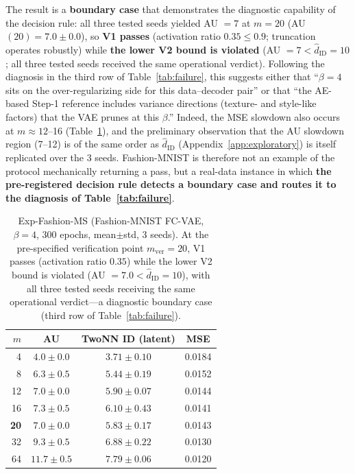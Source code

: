 \documentclass[make,article,submit,pdftex,moreauthors]{Definitions/mdpi}
\newcommand{\hatdID}{\hat{d}_{\mathrm{ID}}}
\begin{document}
The result is a \textbf{boundary case} that demonstrates the diagnostic
capability of the decision rule:
all three tested seeds yielded AU $= 7$ at $m = 20$
(AU$(20) = 7.0 \pm 0.0$), so
\textbf{V1 passes} (activation ratio $0.35 \leq 0.9$; truncation operates
robustly) while \textbf{the lower V2 bound is violated}
(AU $= 7 < \hatdID = 10$; all three tested seeds received the same
operational verdict).
Following the diagnosis in the third row of Table~\ref{tab:failure}, this
suggests either that ``$\beta = 4$ sits on the over-regularizing side for
this data--decoder pair'' or that ``the AE-based Step-1 reference includes
variance directions (texture- and style-like factors) that the VAE prunes
at this $\beta$.''
Indeed, the MSE slowdown also occurs at $m \approx 12$--16
(Table~\ref{tab:fashion_s3}), and the preliminary observation that the AU
slowdown region (7--12) is of the same order as $\hatdID$
(Appendix~\ref{app:exploratory}) is itself replicated over the 3 seeds.
Fashion-MNIST is therefore not an example of the protocol mechanically
returning a pass, but a real-data instance in which \textbf{the
pre-registered decision rule detects a boundary case and routes it to the
diagnosis of Table~\ref{tab:failure}}.

\begin{table}[H]
\caption{Exp-Fashion-MS (Fashion-MNIST FC-VAE, $\beta = 4$, 300 epochs,
mean$\pm$std, 3 seeds). At the pre-specified verification point
$m_{\mathrm{ver}} = 20$, V1 passes (activation ratio $0.35$) while the
lower V2 bound is violated (AU $= 7.0 < \hatdID = 10$), with all three
tested seeds receiving the same operational verdict---a diagnostic boundary
case (third row of Table~\ref{tab:failure}).}
\label{tab:fashion_s3}
\small
\begin{tabular}{rccc}
\toprule
$m$ & \textbf{AU} & \textbf{TwoNN ID (latent)} & \textbf{MSE} \\
\midrule
 4 & $4.0 \pm 0.0$ & $3.71 \pm 0.10$ & 0.0184 \\
 8 & $6.3 \pm 0.5$ & $5.44 \pm 0.19$ & 0.0152 \\
12 & $7.0 \pm 0.0$ & $5.90 \pm 0.07$ & 0.0144 \\
16 & $7.3 \pm 0.5$ & $6.10 \pm 0.43$ & 0.0141 \\
\textbf{20} & $\boldsymbol{7.0 \pm 0.0}$ & $5.83 \pm 0.17$ & 0.0143 \\
32 & $9.3 \pm 0.5$ & $6.88 \pm 0.22$ & 0.0130 \\
64 & $11.7 \pm 0.5$ & $7.79 \pm 0.06$ & 0.0120 \\
\bottomrule
\end{tabular}
\end{table}
\end{document}
